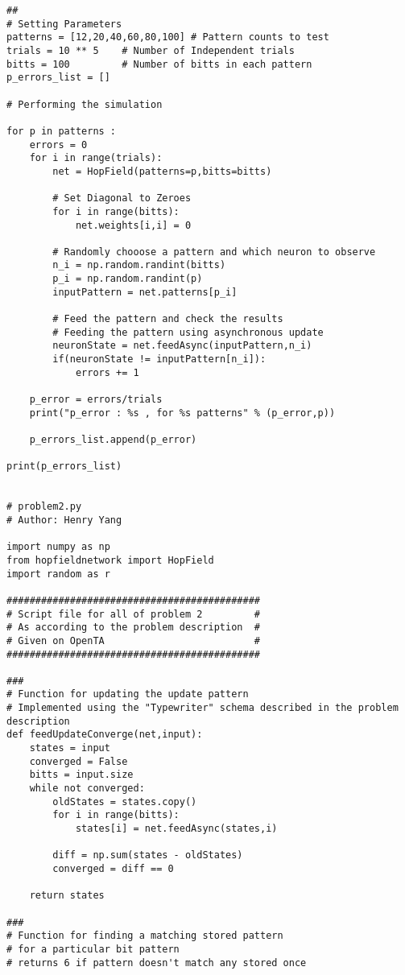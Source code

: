 \documentclass{article}
\begin{document}
\begin{verbatim}
##
# Setting Parameters
patterns = [12,20,40,60,80,100] # Pattern counts to test
trials = 10 ** 5    # Number of Independent trials
bitts = 100         # Number of bitts in each pattern
p_errors_list = []

# Performing the simulation

for p in patterns :
    errors = 0
    for i in range(trials):
        net = HopField(patterns=p,bitts=bitts)

        # Set Diagonal to Zeroes
        for i in range(bitts):
            net.weights[i,i] = 0

        # Randomly chooose a pattern and which neuron to observe
        n_i = np.random.randint(bitts)
        p_i = np.random.randint(p)
        inputPattern = net.patterns[p_i]
        
        # Feed the pattern and check the results
        # Feeding the pattern using asynchronous update
        neuronState = net.feedAsync(inputPattern,n_i)
        if(neuronState != inputPattern[n_i]):
            errors += 1
    
    p_error = errors/trials
    print("p_error : %s , for %s patterns" % (p_error,p))

    p_errors_list.append(p_error)

print(p_errors_list)

        
# problem2.py
# Author: Henry Yang

import numpy as np
from hopfieldnetwork import HopField
import random as r

############################################
# Script file for all of problem 2         #
# As according to the problem description  #
# Given on OpenTA                          #
############################################

###
# Function for updating the update pattern
# Implemented using the "Typewriter" schema described in the problem description
def feedUpdateConverge(net,input):
    states = input
    converged = False
    bitts = input.size
    while not converged:
        oldStates = states.copy()
        for i in range(bitts):
            states[i] = net.feedAsync(states,i)
        
        diff = np.sum(states - oldStates)
        converged = diff == 0
    
    return states

###
# Function for finding a matching stored pattern 
# for a particular bit pattern
# returns 6 if pattern doesn't match any stored once


\end{verbatim}
\end{document}
